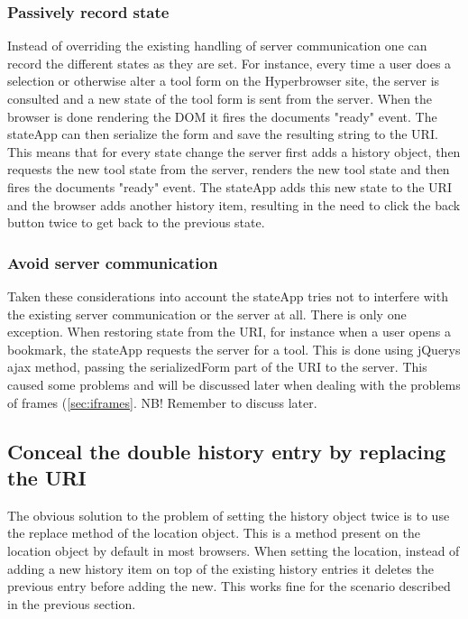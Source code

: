 \documentclass[english]{ifimaster}
\begin{document}
\subsubsection{Passively record state}
Instead of overriding the existing handling of server communication one can record the different states as they are set. For instance, every time a user does a selection or otherwise alter a tool form on the Hyperbrowser site, the server is consulted and a new state of the tool form is sent from the server. When the browser is done rendering the DOM it fires the documents "ready" event. The stateApp can then serialize the form and save the resulting string to the URI. This means that for every state change the server first adds a history object, then requests the new tool state from the server, renders the new tool state and then fires the documents "ready" event. The stateApp adds this new state to the URI and the browser adds another history item, resulting in the need to click the back button twice to get back to the previous state. 

\subsubsection{Avoid server communication}
Taken these considerations into account the stateApp tries not to interfere with the existing server communication or the server at all. There is only one exception. When restoring state from the URI, for instance when a user opens a bookmark, the stateApp requests the server for a tool. This is done using jQuerys ajax method, passing the serializedForm part of the URI to the server. This caused some problems and will be discussed later when dealing with the problems of frames (\ref{sec:iframes}. NB! Remember to discuss later.

\subsection{Conceal the double history entry by replacing the URI}
The obvious solution to the problem of setting the history object twice is to use the replace method of the location object. This is a method present on the location object by default in most browsers. When setting the location, instead of adding a new history item on top of the existing history entries it deletes the previous entry before adding the new. This works fine for the scenario described in the previous section.  
\end{document}
